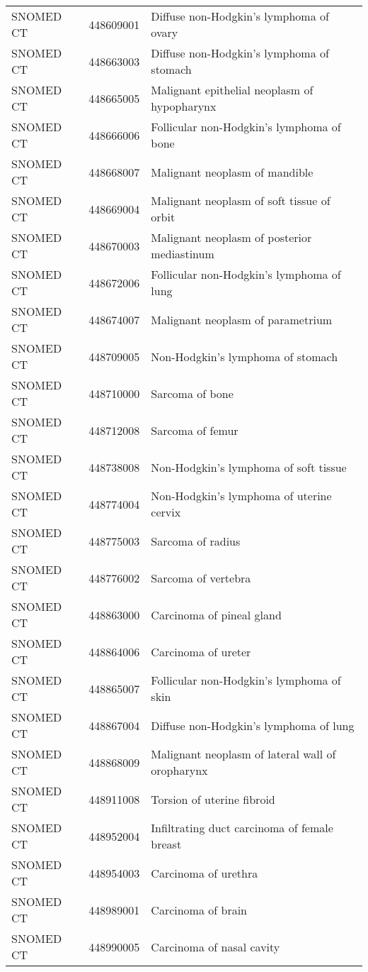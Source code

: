 \begin{longtable}{p{}p{}p{}}
  SNOMED CT & 448609001 & Diffuse non-Hodgkin's lymphoma of ovary \\ 
  SNOMED CT & 448663003 & Diffuse non-Hodgkin's lymphoma of stomach \\ 
  SNOMED CT & 448665005 & Malignant epithelial neoplasm of hypopharynx \\ 
  SNOMED CT & 448666006 & Follicular non-Hodgkin's lymphoma of bone \\ 
  SNOMED CT & 448668007 & Malignant neoplasm of mandible \\ 
  SNOMED CT & 448669004 & Malignant neoplasm of soft tissue of orbit \\ 
  SNOMED CT & 448670003 & Malignant neoplasm of posterior mediastinum \\ 
  SNOMED CT & 448672006 & Follicular non-Hodgkin's lymphoma of lung \\ 
  SNOMED CT & 448674007 & Malignant neoplasm of parametrium \\ 
  SNOMED CT & 448709005 & Non-Hodgkin's lymphoma of stomach \\ 
  SNOMED CT & 448710000 & Sarcoma of bone \\ 
  SNOMED CT & 448712008 & Sarcoma of femur \\ 
  SNOMED CT & 448738008 & Non-Hodgkin's lymphoma of soft tissue \\ 
  SNOMED CT & 448774004 & Non-Hodgkin's lymphoma of uterine cervix \\ 
  SNOMED CT & 448775003 & Sarcoma of radius \\ 
  SNOMED CT & 448776002 & Sarcoma of vertebra \\ 
  SNOMED CT & 448863000 & Carcinoma of pineal gland \\ 
  SNOMED CT & 448864006 & Carcinoma of ureter \\ 
  SNOMED CT & 448865007 & Follicular non-Hodgkin's lymphoma of skin \\ 
  SNOMED CT & 448867004 & Diffuse non-Hodgkin's lymphoma of lung \\ 
  SNOMED CT & 448868009 & Malignant neoplasm of lateral wall of oropharynx \\ 
  SNOMED CT & 448911008 & Torsion of uterine fibroid \\ 
  SNOMED CT & 448952004 & Infiltrating duct carcinoma of female breast \\ 
  SNOMED CT & 448954003 & Carcinoma of urethra \\ 
  SNOMED CT & 448989001 & Carcinoma of brain \\ 
  SNOMED CT & 448990005 & Carcinoma of nasal cavity \\ 

\end{longtable}
